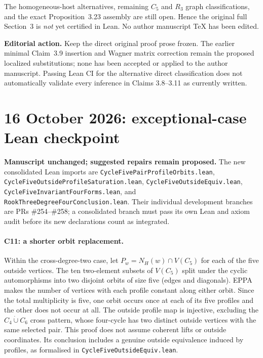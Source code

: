 \documentclass[11pt,a4paper]{article}
\begin{document}
The homogeneous-host alternatives, remaining \(C_5\)
and \(R_3\) graph classifications, and the exact
Proposition~3.23 assembly are still open. Hence the
original full Section~3 is \emph{not} yet certified
in Lean. No author manuscript TeX has been edited.

\textbf{Editorial action.}
Keep the direct original proof prose frozen.
The earlier minimal Claim~3.9 insertion and Wagner
matrix correction remain the proposed localized substitutions;
none has been accepted or applied to the author manuscript.
Passing Lean CI for the alternative direct classification
does not automatically validate every inference in Claims
3.8--3.11 as currently written.

\section*{16 October 2026: exceptional-case Lean checkpoint}
\textbf{Manuscript unchanged; suggested repairs remain proposed.}
The new consolidated Lean imports are
\texttt{CycleFivePairProfileOrbits.lean},
\texttt{CycleFiveOutsideProfileSaturation.lean},
\texttt{CycleFiveOutsideEquiv.lean},
\texttt{CycleFiveInvariantFourForms.lean}, and
\texttt{RookThreeDegreeFourConclusion.lean}.
Their individual development branches are PRs \#254--\#258;
a consolidated branch must pass its own Lean and axiom audit
before its new declarations count as integrated.

\paragraph{C11: a shorter orbit replacement.}
Within the cross-degree-two case, let
\(P_w=N_H(w)\cap V(C_5)\) for each of the five outside vertices.
The ten two-element subsets of \(V(C_5)\) split under the cyclic
automorphisms into two disjoint orbits of size five (edges and
diagonals). EPPA makes the number of vertices with each profile
constant along either orbit. Since the total multiplicity is five,
one orbit occurs once at each of its five profiles and the other
does not occur at all. The outside profile map is injective,
excluding the \(C_4\dot\cup C_6\) cross pattern, whose four-cycle
has two distinct outside vertices with the same selected pair.
This proof does not assume coherent lifts or outside coordinates.
Its conclusion includes a genuine outside equivalence induced by
profiles, as formalised in \texttt{CycleFiveOutsideEquiv.lean}.
\end{document}
